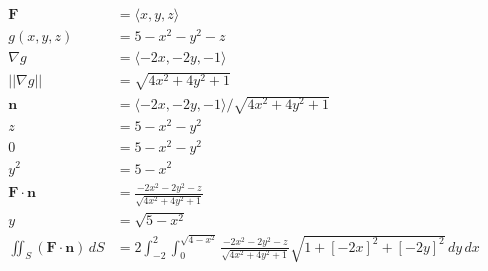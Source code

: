 \documentclass{article}
\begin{document}
\setcounter{subsubsection}{30}
\subsubsection{}

\begin{align*}
  \mathbf{F}                                 & = \langle x, y, z \rangle                                                                                                            \\
  g(x, y, z)                                 & = 5 - x^2 - y^2 - z                                                                                                                  \\
  \nabla g                                   & = \langle -2 x, -2 y, -1 \rangle                                                                                                     \\
  ||\nabla g||                               & = \sqrt{4 x^2 + 4 y^2 + 1}                                                                                                           \\
  \mathbf{n}                                 & = \langle -2 x, -2 y, -1 \rangle / \sqrt{4 x^2 + 4 y^2 + 1}                                                                          \\
  z                                          & = 5 - x^2 - y^2                                                                                                                      \\
  0                                          & = 5 - x^2 - y^2                                                                                                                      \\
  y^2                                        & = 5 - x^2                                                                                                                            \\
  \mathbf{F} \cdot \mathbf{n}                & = \frac{-2 x^2 - 2 y^2 - z}{\sqrt{4 x^2 + 4 y^2 + 1}}                                                                                \\
  y                                          & = \sqrt{5 - x^2}                                                                                                                     \\
  \iint_S (\mathbf{F} \cdot \mathbf{n}) \,dS & = 2 \int_{-2}^2 \int_0^{\sqrt{4 - x^2}} \frac{-2 x^2 - 2 y^2 - z}{\sqrt{4 x^2 + 4 y^2 + 1}} \sqrt{1 + [-2 x]^2 + [-2 y]^2} \,dy \,dx \\

\end{align*}
\end{document}
